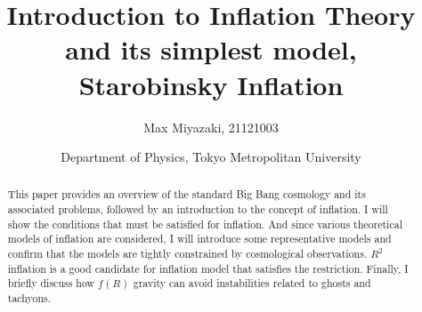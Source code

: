 \documentclass[12pt]{article}
\title{ Introduction to Inflation Theory and its simplest model, Starobinsky Inflation }
\date{Department of Physics, Tokyo Metropolitan University}
\author{Max Miyazaki, 21121003}
\numberwithin{equation}{section}
\begin{document}
\maketitle
\vspace{1cm}
\begin{abstract}
    This paper provides an overview of the standard Big Bang cosmology and its associated problems, followed by an introduction to the concept of inflation. I will show the conditions that must be satisfied for inflation. And since various theoretical models of inflation are considered, I will introduce some representative models and confirm that the models are tightly constrained by cosmological observations. $R^2$ inflation is a good candidate for inflation model that satisfies the restriction. Finally, I briefly discuss how $f(R)$ gravity can avoid instabilities related to ghosts and tachyons.
\end{abstract}

\newpage
\tableofcontents
\newpage
\end{document}
